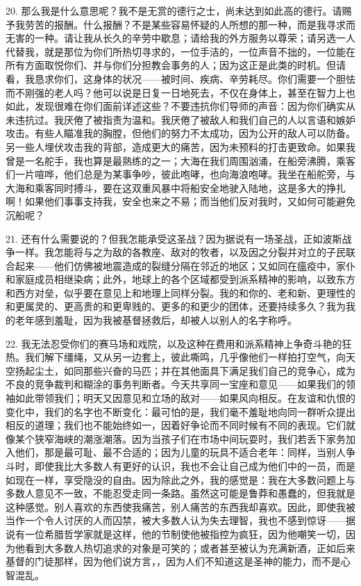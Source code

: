 20. 那么我是什么意思呢？我不是无赏的德行之士，尚未达到如此高的德行。请赐予我劳苦的报酬。什么报酬？不是某些容易怀疑的人所想的那一种，而是我寻求而无害的一种。请让我从长久的辛劳中歇息；请给我的外方服务以尊荣；请另选一人代替我，就是那位为你们所热切寻求的，一位手洁的，一位声音不拙的，一位能在所有方面取悦你们、并与你们分担教会事务的人；因为这正是此类的时机。但请看，我恳求你们，这身体的状况——被时间、疾病、辛劳耗尽。你们需要一个胆怯而不刚强的老人吗？他可以说是日复一日地死去，不仅在身体上，甚至在智力上也如此，发现很难在你们面前详述这些？不要违抗你们导师的声音：因为你们确实从未违抗过。我厌倦了被指责为温和。我厌倦了被敌人和我们自己的人以言语和嫉妒攻击。有些人瞄准我的胸膛，但他们的努力不太成功，因为公开的敌人可以防备。另一些人埋伏攻击我的背部，造成更大的痛苦，因为未预料的打击更致命。如果我曾是一名舵手，我也算是最熟练的之一；大海在我们周围汹涌，在船旁沸腾，乘客们一片喧哗，他们总是为某事争吵，彼此咆哮，也向海浪咆哮。我坐在船舵旁，与大海和乘客同时搏斗，要在这双重风暴中将船安全地驶入陆地，这是多大的挣扎啊！如果他们事事支持我，安全也来之不易；而当他们反对我时，又如何可能避免沉船呢？\par

21. 还有什么需要说的？但我怎能承受这圣战？因为据说有一场圣战，正如波斯战争一样。我怎能将与之为敌的各教座、敌对的牧者，以及因之分裂并对立的子民联合起来——他们仿佛被地震造成的裂缝分隔在邻近的地区；又如同在瘟疫中，家仆和家庭成员相继染病；此外，地球上的各个区域都受到派系精神的影响，以致东方和西方对垒，似乎要在意见上和地理上同样分裂。我的和你的、老和新、更理性的和更属灵的、更高贵的和更卑贱的、更多的和更少的团体，还要持续多久？我为我的老年感到羞耻，因为我被基督拯救后，却被人以别人的名字称呼。\par

22. 我无法忍受你们的赛马场和戏院，以及这种在费用和派系精神上争奇斗艳的狂热。我们解下缰绳，又从另一边套上，彼此嘶鸣，几乎像他们一样拍打空气，向天空扬起尘土，如同那些兴奋的马匹；并在其他面具下满足我们自己的竞争心，成为不良的竞争裁判和糊涂的事务判断者。今天共享同一宝座和意见——如果我们的领袖如此带领我们；明天又因意见和立场的敌对——如果风向相反。在友谊和仇恨的变化中，我们的名字也不断变化：最可怕的是，我们毫不羞耻地向同一群听众提出相反的道理；我们也不能始终如一，因着好争论而不同时候有不同的表现。它们就像某个狭窄海峡的潮涨潮落。因为当孩子们在市场中间玩耍时，我们若丢下家务加入他们，那是最可耻、最不合适的；因为儿童的玩具不适合老年：同样，当别人争斗时，即使我比大多数人有更好的认识，我也不会让自己成为他们中的一员，而是如现在一样，享受隐没的自由。因为除此之外，我的感觉是：我在大多数问题上与多数人意见不一致，不能忍受走同一条路。虽然这可能是鲁莽和愚蠢的，但我就是这种感觉。别人喜欢的东西使我痛苦，别人痛苦的东西我却喜欢。因此，即使我被当作一个令人讨厌的人而囚禁，被大多数人认为失去理智，我也不感到惊讶——据说有一位希腊哲学家就是这样，他的节制使他被指控为疯狂，因为他嘲笑一切，因为他看到大多数人热切追求的对象是可笑的；或者甚至被认为充满新酒，正如后来基督的门徒那样，因为他们说方言，，因为人们不知道这是圣神的能力，而不是心智混乱。\par

